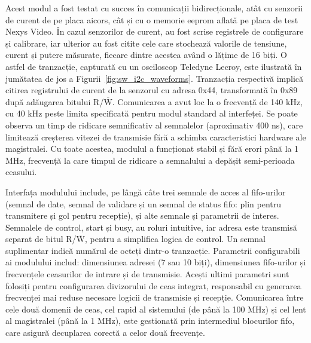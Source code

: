 \documentclass[12pt,a4paper]{report}
\begin{document}
Acest modul a fost testat cu succes în comunicații bidirecționale, atât cu senzorii de curent de pe placa \gls{aicors}, cât și cu o memorie \gls{eeprom} aflată pe placa de test Nexys Video. În cazul senzorilor de curent, au fost scrise registrele de configurare și calibrare, iar ulterior au fost citite cele care stochează valorile de tensiune, curent și putere măsurate, fiecare dintre acestea având o lățime de 16 biți. O astfel de tranzacție, capturată cu un osciloscop Teledyne Lecroy, este ilustrată în jumătatea de jos a Figurii~\ref{fig:sw_i2c_waveforms}. Tranzacția respectivă implică citirea registrului de curent de la senzorul cu adresa 0x44, transformată în 0x89 după adăugarea bitului R/$\overline{\mbox{W}}$. Comunicarea a avut loc la o frecvență de 140 kHz, cu 40 kHz peste limita specificată pentru modul standard al interfeței. Se poate observa un timp de ridicare semnificativ al semnalelor (aproximativ 400 ns), care limitează creșterea vitezei de transmisie fără a schimba caracteristici hardware ale magistralei. Cu toate acestea, modulul a funcționat stabil și fără erori până la 1 MHz, frecvență la care timpul de ridicare a semnalului a depășit semi-perioada ceasului.

Interfața modulului include, pe lângă câte trei semnale de acces al  \gls{fifo}-urilor (semnal de date, semnal de validare și un semnal de status \gls{fifo}: plin pentru transmitere și gol pentru recepție), și alte semnale și parametrii de interes. Semnalele de control, start și busy, au roluri intuitive, iar adresa este transmisă separat de bitul R/$\overline{\mbox{W}}$, pentru a simplifica logica de control. Un semnal suplimentar indică numărul de octeți dintr-o tranzacție. Parametrii configurabili ai modulului includ: dimensiunea adresei (7 sau 10 biți), dimensiunea \gls{fifo}-urilor și frecvențele ceasurilor de intrare și de transmisie. Acești ultimi parametri sunt folosiți pentru configurarea divizorului de ceas integrat, responsabil cu generarea frecvenței mai reduse necesare logicii de transmisie și recepție. Comunicarea între cele două domenii de ceas, cel rapid al sistemului (de până la 100  MHz) și cel lent al magistralei (până la 1 MHz), este gestionată prin intermediul blocurilor \gls{fifo}, care asigură decuplarea corectă a celor două frecvențe.
\end{document}
